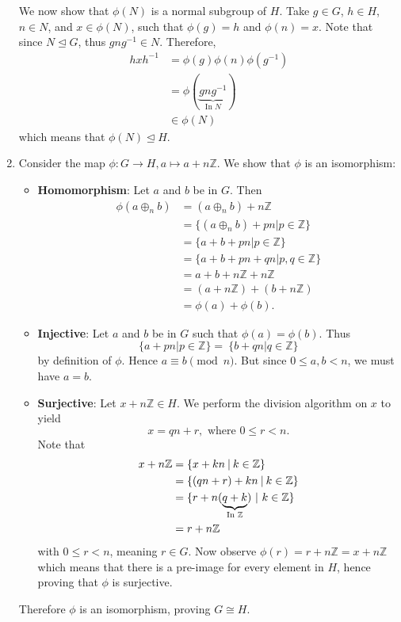 \begin{enumerate}
    We now show that $\phi(N)$ is a normal subgroup of $H$. Take $g \in G$, $h \in H$, $n \in N$, and $x \in \phi(N)$, such that $\phi(g) = h$ and $\phi(n) = x$. Note that since $N \unlhd G$, thus $gng^{-1} \in N$. Therefore,
    \begin{align*}
        hxh^{-1} &= \phi(g)\phi(n)\phi(g^{-1})\\
        &= \phi(\underbrace{gng^{-1}}_{\text{In }N})\\
        &\in \phi(N)
    \end{align*}
    which means that $\phi(N) \unlhd H$.

    \item Consider the map $\phi: G \to H, a \mapsto a + n\mathbb{Z}$. We show that $\phi$ is an isomorphism:
    \begin{itemize}
        \item \textbf{Homomorphism}: Let $a$ and $b$ be in $G$. Then
        \begin{align*}
            \phi(a\oplus_n b) &= (a\oplus_n b) + n\mathbb{Z}\\
            &= \{(a \oplus_n b) + pn \vert p \in \mathbb{Z}\}\\
            &= \{a+b + pn \vert p \in \mathbb{Z}\}\\
            &= \{a+b + pn + qn\vert p, q \in \mathbb{Z}\}\\
            &= a+b+n\mathbb{Z} + n\mathbb{Z}\\
            &= (a+n\mathbb{Z}) + (b + n\mathbb{Z})\\
            &= \phi(a) + \phi(b).
        \end{align*}
        \item \textbf{Injective}: Let $a$ and $b$ be in $G$ such that $\phi(a) = \phi(b)$. Thus
        \[
            \{a + pn \vert p \in \mathbb{Z} \} = \ \{b + qn \vert q \in \mathbb{Z} \}
        \]
        by definition of $\phi$. Hence $a \equiv b \pmod n$. But since $0 \leq a, b < n$, we must have $a = b$.
        \item \textbf{Surjective}: Let $x + n\mathbb{Z} \in H$. We perform the division algorithm on $x$ to yield
        \[
            x = qn + r, \text{ where } 0 \leq r < n.
        \]
        Note that
        \begin{align*}
            x + n\mathbb{Z} &= \{x + kn \vert k \in \mathbb{Z}\}\\
            &= \{(qn + r) + kn \vert k \in \mathbb{Z}\}\\
            &= \{r + n(\underbrace{q + k}_{\text{In }\mathbb{Z}}) \vertalt k \in \mathbb{Z} \}\\
            &= r + n\mathbb{Z}
        \end{align*}
        with $0 \leq r < n$, meaning $r \in G$. Now observe $\phi(r) = r+n\mathbb{Z} = x+n\mathbb{Z}$ which means that there is a pre-image for every element in $H$, hence proving that $\phi$ is surjective.
    \end{itemize}
    Therefore $\phi$ is an isomorphism, proving $G \cong H$.
    

\end{enumerate}

